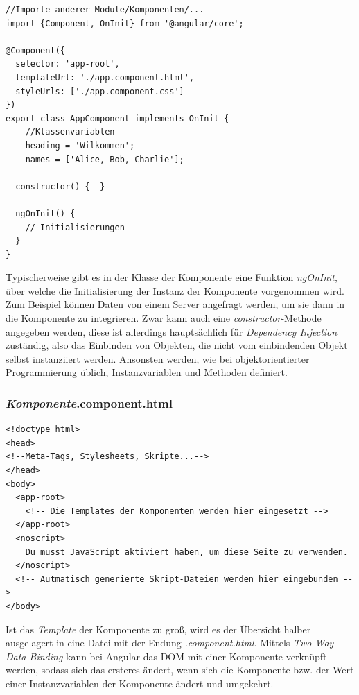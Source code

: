 \begin{lstlisting}[float, floatplacement=h, style=htmlcssjs, caption={Bespiel für eine \textit{AppComponent}.ts-Datei}, label={AppComponent}]
//Importe anderer Module/Komponenten/...
import {Component, OnInit} from '@angular/core';

@Component({
  selector: 'app-root',
  templateUrl: './app.component.html',
  styleUrls: ['./app.component.css']
})
export class AppComponent implements OnInit {
	//Klassenvariablen
	heading = 'Wilkommen';
	names = ['Alice, Bob, Charlie'];

  constructor() {  }

  ngOnInit() {
    // Initialisierungen
  }
}
\end{lstlisting}
Typischerweise gibt es in der Klasse der Komponente eine Funktion \textit{ngOnInit}, über welche die Initialisierung der Instanz der Komponente vorgenommen wird. Zum Beispiel können Daten von einem Server angefragt werden, um sie dann in die Komponente zu integrieren. Zwar kann auch eine \textit{constructor}-Methode angegeben werden, diese ist allerdings hauptsächlich für \textit{Dependency Injection} zuständig, also das Einbinden von Objekten, die nicht vom einbindenden Objekt selbst instanziiert werden. Ansonsten werden, wie bei objektorientierter Programmierung üblich, Instanzvariablen und Methoden definiert\cite{ComponentTS}.

\subsubsection{\textit{Komponente}.component.html}
\label{sec:technologies:angular:component:html}

\begin{lstlisting}[float, floatplacement=h, style=htmlcssjs, caption={Beispiel für eine index.html-Datei einer Angular-App}, label={IndexHTML}]
<!doctype html>
<head>
<!--Meta-Tags, Stylesheets, Skripte...-->
</head>
<body>
  <app-root>
  	<!-- Die Templates der Komponenten werden hier eingesetzt -->
  </app-root>
  <noscript>
    Du musst JavaScript aktiviert haben, um diese Seite zu verwenden.
  </noscript>
  <!-- Autmatisch generierte Skript-Dateien werden hier eingebunden -->
</body>
\end{lstlisting}

Ist das \textit{Template} der Komponente zu groß, wird es der Übersicht halber ausgelagert in eine Datei mit der Endung \textit{.component.html}. Mittels \textit{Two-Way Data Binding} kann bei Angular das \acs{DOM} mit einer Komponente verknüpft werden, sodass sich das ersteres ändert, wenn sich die Komponente bzw. der Wert einer Instanzvariablen der Komponente ändert und umgekehrt.

